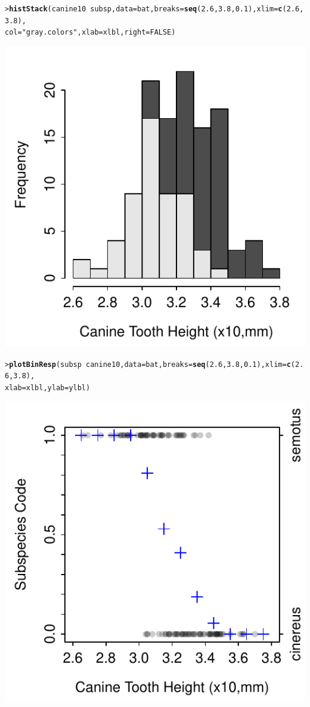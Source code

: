 \documentclass{article}\usepackage[]{graphicx}\usepackage[]{color}
\makeatletter
\newcommand{\hlnum}[1]{\textcolor[rgb]{0.686,0.059,0.569}{#1}}%
\newcommand{\hlstr}[1]{\textcolor[rgb]{0.192,0.494,0.8}{#1}}%
\newcommand{\hlopt}[1]{\textcolor[rgb]{0,0,0}{#1}}%
\newcommand{\hlstd}[1]{\textcolor[rgb]{0.345,0.345,0.345}{#1}}%
\newcommand{\hlkwc}[1]{\textcolor[rgb]{0.333,0.667,0.333}{#1}}%
\newcommand{\hlkwd}[1]{\textcolor[rgb]{0.737,0.353,0.396}{\textbf{#1}}}%
\newenvironment{kframe}{%
 \def\at@end@of@kframe{}%
 \ifinner\ifhmode%
  \def\at@end@of@kframe{\end{minipage}}%
  \begin{minipage}{\columnwidth}%
 \fi\fi%
 \def\FrameCommand##1{\hskip\@totalleftmargin \hskip-\fboxsep
 \colorbox{shadecolor}{##1}\hskip-\fboxsep
     \hskip-\linewidth \hskip-\@totalleftmargin \hskip\columnwidth}%
 \MakeFramed {\advance\hsize-\width
   \@totalleftmargin\z@ \linewidth\hsize
   \@setminipage}}%
 {\par\unskip\endMakeFramed%
 \at@end@of@kframe}
\newenvironment{knitrout}{}{} %
\makeatother
\begin{document}
\newpage
\begin{knitrout}
\color{fgcolor}\begin{kframe}
\begin{alltt}
\hlstd{> }\hlkwd{histStack}\hlstd{(canine10}\hlopt{~}\hlstd{subsp,}\hlkwc{data}\hlstd{=bat,}\hlkwc{breaks}\hlstd{=}\hlkwd{seq}\hlstd{(}\hlnum{2.6}\hlstd{,}\hlnum{3.8}\hlstd{,}\hlnum{0.1}\hlstd{),}\hlkwc{xlim}\hlstd{=}\hlkwd{c}\hlstd{(}\hlnum{2.6}\hlstd{,}\hlnum{3.8}\hlstd{),}
\hlstd{ }          \hlkwc{col}\hlstd{=}\hlstr{"gray.colors"}\hlstd{,}\hlkwc{xlab}\hlstd{=xlbl,}\hlkwc{right}\hlstd{=}\hlnum{FALSE}\hlstd{)}
\end{alltt}
\end{kframe}

{\centering \includegraphics[width=.5\linewidth]{Figs/BatLogHist2-1} 

}



\end{knitrout}
\begin{knitrout}
\color{fgcolor}\begin{kframe}
\begin{alltt}
\hlstd{> }\hlkwd{plotBinResp}\hlstd{(subsp}\hlopt{~}\hlstd{canine10,}\hlkwc{data}\hlstd{=bat,}\hlkwc{breaks}\hlstd{=}\hlkwd{seq}\hlstd{(}\hlnum{2.6}\hlstd{,}\hlnum{3.8}\hlstd{,}\hlnum{0.1}\hlstd{),}\hlkwc{xlim}\hlstd{=}\hlkwd{c}\hlstd{(}\hlnum{2.6}\hlstd{,}\hlnum{3.8}\hlstd{),}
\hlstd{ }            \hlkwc{xlab}\hlstd{=xlbl,}\hlkwc{ylab}\hlstd{=ylbl)}
\end{alltt}
\end{kframe}

{\centering \includegraphics[width=.5\linewidth]{Figs/BatLogPlot-1} 

}



\end{knitrout}
\end{document}
